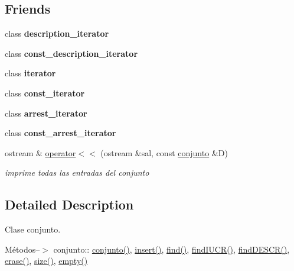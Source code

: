 \subsection*{Friends}
\begin{DoxyCompactItemize}
\item 
\hypertarget{classconjunto_a1f956dc6494785c3139e78f0461a0d79}{}class {\bfseries description\+\_\+iterator}\label{classconjunto_a1f956dc6494785c3139e78f0461a0d79}

\item 
\hypertarget{classconjunto_a94bb81fe23207e5e2e02998e35339080}{}class {\bfseries const\+\_\+description\+\_\+iterator}\label{classconjunto_a94bb81fe23207e5e2e02998e35339080}

\item 
\hypertarget{classconjunto_a67171474c4da6cc8efe0c7fafefd2b2d}{}class {\bfseries iterator}\label{classconjunto_a67171474c4da6cc8efe0c7fafefd2b2d}

\item 
\hypertarget{classconjunto_ac220ce1c155db1ac44146c12d178056f}{}class {\bfseries const\+\_\+iterator}\label{classconjunto_ac220ce1c155db1ac44146c12d178056f}

\item 
\hypertarget{classconjunto_a65d16dbfcb2013bef4406fd55746cd2b}{}class {\bfseries arrest\+\_\+iterator}\label{classconjunto_a65d16dbfcb2013bef4406fd55746cd2b}

\item 
\hypertarget{classconjunto_a9a6448ab80236b81754c8636d1c5fd9f}{}class {\bfseries const\+\_\+arrest\+\_\+iterator}\label{classconjunto_a9a6448ab80236b81754c8636d1c5fd9f}

\item 
ostream \& \hyperlink{classconjunto_ae54b721035471d372f29c0335c42734a}{operator$<$$<$} (ostream \&sal, const \hyperlink{classconjunto}{conjunto} \&D)
\begin{DoxyCompactList}\small\item\em imprime todas las entradas del conjunto \end{DoxyCompactList}\end{DoxyCompactItemize}


\subsection{Detailed Description}
Clase conjunto. 

Métodos--$>$ conjunto\+:\+: \hyperlink{classconjunto_a16d987f42c679efab01748178ba45891}{conjunto()}, \hyperlink{classconjunto_aa65b9f7c4cb9bad6d4e40c1973095930}{insert()}, \hyperlink{classconjunto_a64d02e56b460a58d596f986c055f0a2e}{find()}, \hyperlink{classconjunto_a2ca2a7b59bce8369e9d9ccc1c7be9614}{find\+I\+U\+C\+R()}, \hyperlink{classconjunto_afff3e7f4b3d00f422dd7ab2fec935378}{find\+D\+E\+S\+C\+R()}, \hyperlink{classconjunto_ad550177fa4454da3a10fa356417e39a7}{erase()}, \hyperlink{classconjunto_a52ce2f5a076772be81f7d9bf0c22a558}{size()}, \hyperlink{classconjunto_afcf4ff3ff3c1f83b63e901efebe93533}{empty()}

